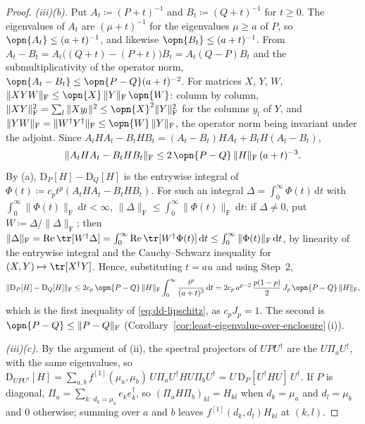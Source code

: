 \begin{proof}
\emph{(iii)(b).} Put $A_t\coloneqq(P+t)^{-1}$ and $B_t\coloneqq(Q+t)^{-1}$
for $t\ge0$. The eigenvalues of $A_t$ are $(\mu+t)^{-1}$ for the eigenvalues
$\mu\ge a$ of $P$, so $\opn{A_t}\le(a+t)^{-1}$, and likewise
$\opn{B_t}\le(a+t)^{-1}$. From
$A_t-B_t=A_t\big((Q+t)-(P+t)\big)B_t=A_t(Q-P)B_t$ and the
submultiplicativity of the operator norm,
$\opn{A_t-B_t}\le\opn{P-Q}(a+t)^{-2}$. For matrices $X$, $Y$, $W$,
$\|XYW\|_{\mathrm F}\le\opn{X}\,\|Y\|_{\mathrm F}\,\opn{W}$: column by
column, $\|XY\|_{\mathrm F}^{2}=\sum_l\|Xy_l\|^{2}\le\opn{X}^{2}
\|Y\|_{\mathrm F}^{2}$ for the columns $y_l$ of $Y$, and
$\|YW\|_{\mathrm F}=\|W^{\dagger}Y^{\dagger}\|_{\mathrm F}
\le\opn{W}\,\|Y\|_{\mathrm F}$, the operator norm being invariant under the
adjoint. Since $A_tHA_t-B_tHB_t=(A_t-B_t)HA_t+B_tH(A_t-B_t)$,
\begin{equation*}
  \|A_tHA_t-B_tHB_t\|_{\mathrm F}\le2\,\opn{P-Q}\,\|H\|_{\mathrm F}\,(a+t)^{-3}.
\end{equation*}
By (a), $\mathrm{D}_P[H]-\mathrm{D}_Q[H]$ is the entrywise integral of
$\Phi(t)\coloneqq c_pt^{p}(A_tHA_t-B_tHB_t)$. For such an integral
$\Delta=\int_0^{\infty}\Phi(t)\,\mathrm dt$ with
$\int_0^{\infty}\|\Phi(t)\|_{\mathrm F}\,\mathrm dt<\infty$,
$\|\Delta\|_{\mathrm F}\le\int_0^{\infty}\|\Phi(t)\|_{\mathrm F}\,\mathrm dt$:
if $\Delta\ne0$, put $W\coloneqq\Delta/\|\Delta\|_{\mathrm F}$; then
$\|\Delta\|_{\mathrm F}=\operatorname{Re}\tr[W^{\dagger}\Delta]
=\int_0^{\infty}\operatorname{Re}\tr[W^{\dagger}\Phi(t)]\,\mathrm dt
\le\int_0^{\infty}\|\Phi(t)\|_{\mathrm F}\,\mathrm dt$, by linearity of the
entrywise integral and the Cauchy--Schwarz inequality for
$(X,Y)\mapsto\tr[X^{\dagger}Y]$. Hence, substituting $t=au$ and using
Step~2,
\begin{equation*}
  \|\mathrm{D}_P[H]-\mathrm{D}_Q[H]\|_{\mathrm F}
  \le2c_p\,\opn{P-Q}\,\|H\|_{\mathrm F}\int_0^{\infty}\frac{t^{p}}{(a+t)^{3}}\,\mathrm dt
  =2c_p\,a^{p-2}\,\frac{p(1-p)}{2}\,J_p\,\opn{P-Q}\,\|H\|_{\mathrm F},
\end{equation*}
which is the first inequality of \eqref{eq:dd-lipschitz}, as $c_pJ_p=1$. The
second is $\opn{P-Q}\le\|P-Q\|_{\mathrm F}$
(Corollary~\ref{cor:least-eigenvalue-over-enclosure}\,(i)).

\emph{(iii)(c).} By the argument of (ii), the spectral projectors of
$UPU^{\dagger}$ are the $U\Pi_aU^{\dagger}$, with the same eigenvalues, so
$\mathrm{D}_{UPU^{\dagger}}[H]=\sum_{a,b}f^{[1]}(\mu_a,\mu_b)\,
U\Pi_aU^{\dagger}HU\Pi_bU^{\dagger}=U\,\mathrm{D}_P[U^{\dagger}HU]\,U^{\dagger}$.
If $P$ is diagonal, $\Pi_a=\sum_{k:\,d_k=\mu_a}e_ke_k^{\dagger}$, so
$(\Pi_aH\Pi_b)_{kl}=H_{kl}$ when $d_k=\mu_a$ and $d_l=\mu_b$ and $0$
otherwise; summing over $a$ and $b$ leaves
$f^{[1]}(d_k,d_l)H_{kl}$ at $(k,l)$.


\end{proof}
